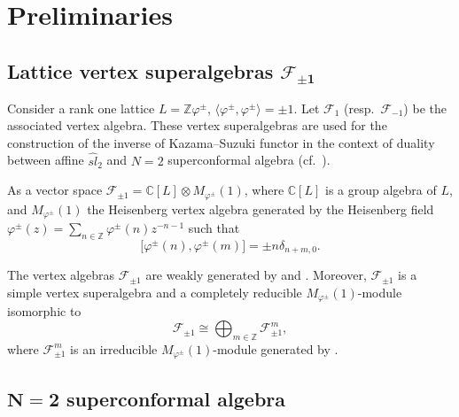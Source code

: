 \documentclass[11pt]{article}
\numberwithin{equation}{section}
\newcommand{\Z}{\mathbb Z}
\newcommand{\C}{\mathbb C}
\newcommand{\F}{\mathcal F}
\begin{document}
\section{Preliminaries}	

\subsection[Lattice vertex superalgebras F\_1]{ Lattice vertex superalgebras $\boldsymbol{\mathcal F_{\pm 1}}$} \label{F_{-1}}

Consider a rank one lattice $L= {\Z}\varphi^{\pm} $, $\big\langle \varphi^{\pm}, \varphi^{\pm} \big\rangle = \pm 1$. Let $\F_{1}$ (resp.\ $\F_{-1}$) be the associated vertex algebra. These vertex superalgebras are used for the construction of the inverse of Kazama--Suzuki functor in the context of duality between affine $\widehat{sl}_2$ and $N=2$ superconformal algebra (cf.\ \cite{A-IMRN,A-2001,FST}).

As a vector space $\F_{\pm 1} = {\C}[L] \otimes M_{\varphi^{\pm}} (1)$, where ${\C}[L]$ is a group algebra of $L$, and $M_{\varphi^{\pm}} (1)$ the Heisenberg vertex algebra generated by the Heisenberg field $\varphi^{\pm}(z) = \sum_{n \in {\Z} } \varphi^{\pm}(n) z^{-n-1}$ such that
\[
 \bigl[\varphi^{\pm}(n), \varphi^{\pm}(m)\bigr] = \pm n \delta_{n+m, 0}.
 \]

The vertex algebras $\F_{\pm 1}$ are weakly generated by  and .
Moreover, $\F_{\pm 1}$ is a simple vertex superalgebra and a completely reducible $M_{\varphi^{\pm}} (1)$-module isomorphic to
\[
\F_{\pm 1} \cong \bigoplus_{m \in \mathbb{Z}} \F_{\pm 1}^m ,
\]
where $ \F_{\pm 1}^m$ is an irreducible $M_{\varphi^{\pm}} (1)$-module generated by .


\subsection[N=2 superconformal algebra]{$\boldsymbol{ N=2}$ superconformal algebra}
\end{document}
